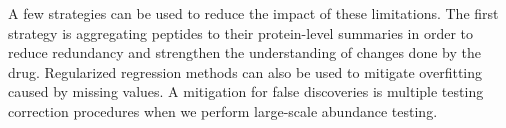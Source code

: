 A few strategies can be used to reduce the impact of these limitations. The first strategy is aggregating peptides to their protein-level summaries in order to reduce redundancy and strengthen the understanding of changes done by the drug. Regularized regression methods can also be used to mitigate overfitting caused by missing values. A mitigation for false discoveries is multiple testing correction procedures when we perform large-scale abundance testing. 

